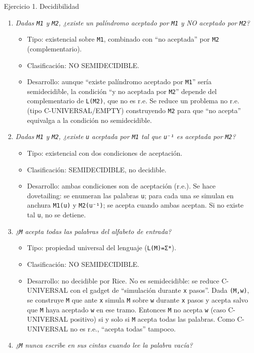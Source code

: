 \documentclass[12pt]{book} %
\providecommand{\tightlist}{%
  \setlength{\itemsep}{0pt}\setlength{\parskip}{0pt}}
\begin{document}
Ejercicio 1. Decidibilidad

\begin{enumerate}
\def\labelenumi{\arabic{enumi}.}
\tightlist
\item
  \emph{Dadas \texttt{M1} y \texttt{M2}, ¿existe un palíndromo aceptado
  por \texttt{M1} y NO aceptado por \texttt{M2}?}

  \begin{itemize}
  \tightlist
  \item
    Tipo: existencial sobre \texttt{M1}, combinado con ``no aceptada''
    por \texttt{M2} (complementario).
  \item
    Clasificación: NO SEMIDECIDIBLE.
  \item
    Desarrollo: aunque ``existe palíndromo aceptado por \texttt{M1}''
    sería semidecidible, la condición ``y no aceptada por \texttt{M2}''
    depende del complementario de \texttt{L(M2)}, que no es r.e. Se
    reduce un problema no r.e. (tipo C-UNIVERSAL/EMPTY) construyendo
    \texttt{M2} para que ``no acepta'' equivalga a la condición no
    semidecidible.
  \end{itemize}
\item
  \emph{Dadas \texttt{M1} y \texttt{M2}, ¿existe \texttt{u} aceptada por
  \texttt{M1} tal que \texttt{u⁻¹} es aceptada por \texttt{M2}?}

  \begin{itemize}
  \tightlist
  \item
    Tipo: existencial con dos condiciones de aceptación.
  \item
    Clasificación: SEMIDECIDIBLE, no decidible.
  \item
    Desarrollo: ambas condiciones son de aceptación (r.e.). Se hace
    dovetailing: se enumeran las palabras \texttt{u}; para cada una se
    simulan en anchura \texttt{M1(u)} y \texttt{M2(u⁻¹)}; se acepta
    cuando ambas aceptan. Si no existe tal \texttt{u}, no se detiene.
  \end{itemize}
\item
  \emph{¿\texttt{M} acepta todas las palabras del alfabeto de entrada?}

  \begin{itemize}
  \tightlist
  \item
    Tipo: propiedad universal del lenguaje (\texttt{L(M)=Σ*}).
  \item
    Clasificación: NO SEMIDECIDIBLE.
  \item
    Desarrollo: no decidible por Rice. No es semidecidible: se reduce
    C-UNIVERSAL con el gadget de ``simulación durante
    \texttt{\textbar{}x\textbar{}} pasos''. Dada \texttt{(M,w)}, se
    construye \texttt{M\textquotesingle{}} que ante \texttt{x} simula
    \texttt{M} sobre \texttt{w} durante \texttt{\textbar{}x\textbar{}}
    pasos y acepta salvo que \texttt{M} haya aceptado \texttt{w} en ese
    tramo. Entonces \texttt{M} no acepta \texttt{w} (caso C-UNIVERSAL
    positivo) si y solo si \texttt{M\textquotesingle{}} acepta todas las
    palabras. Como C-UNIVERSAL no es r.e., ``acepta todas'' tampoco.
  \end{itemize}
\item
  \emph{¿\texttt{M} nunca escribe en sus cintas cuando lee la palabra
  vacía?}


\end{enumerate}
\end{document}
